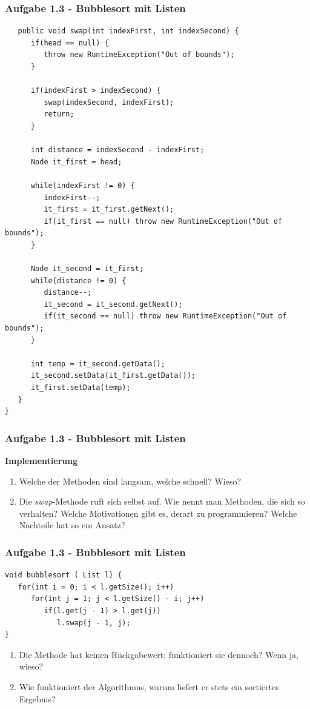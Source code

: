 \documentclass{beamer}
\begin{document}
\begin{frame}[fragile]
	\frametitle{Aufgabe 1.3 - Bubblesort mit Listen}
	\begin{verbatim}
   public void swap(int indexFirst, int indexSecond) {
      if(head == null) {
         throw new RuntimeException("Out of bounds");
      }

      if(indexFirst > indexSecond) {
         swap(indexSecond, indexFirst);
         return;
      }

      int distance = indexSecond - indexFirst;
      Node it_first = head;

      while(indexFirst != 0) {
         indexFirst--;
         it_first = it_first.getNext();
         if(it_first == null) throw new RuntimeException("Out of bounds");
      }

      Node it_second = it_first;
      while(distance != 0) {
         distance--;
         it_second = it_second.getNext();
         if(it_second == null) throw new RuntimeException("Out of bounds");
      }

      int temp = it_second.getData();
      it_second.setData(it_first.getData());
      it_first.setData(temp);
   }
}
   \end{verbatim}
\end{frame}


\begin{frame}
	\frametitle{Aufgabe 1.3 - Bubblesort mit Listen}
	\textbf{Implementierung}
	\begin{enumerate}
		\item Welche der Methoden sind langsam, welche schnell? Wieso?
		\item Die \textit{swap}-Methode ruft sich selbst auf. Wie nennt man Methoden, die sich so verhalten?
		      Welche Motivationen gibt es, derart zu programmieren? Welche Nachteile hat so ein Ansatz?
	\end{enumerate}
\end{frame}

\begin{frame}[fragile]
	\frametitle{Aufgabe 1.3 - Bubblesort mit Listen}
	\begin{verbatim}
void bubblesort ( List l) {
   for(int i = 0; i < l.getSize(); i++)
      for(int j = 1; j < l.getSize() - i; j++)
         if(l.get(j - 1) > l.get(j))
            l.swap(j - 1, j);
}
         \end{verbatim}
	\begin{enumerate}
		\item Die Methode hat keinen Rückgabewert; funktioniert sie dennoch? Wenn ja, wieso?
		\item Wie funktioniert der Algorithmus, warum liefert er stets ein sortiertes Ergebnis?
	\end{enumerate}
\end{frame}
\end{document}
